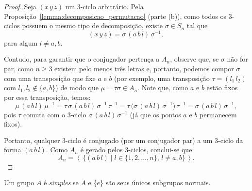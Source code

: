 \documentclass[11pt,openany]{book}
\begin{document}
\begin{proof}
Seja \((x\,y\,z)\) um \(3\)-ciclo arbitrário. Pela Proposição~\ref{lemma:decomposicao_permutacao} (parte (b)), como todos os \(3\)-ciclos possuem o mesmo tipo de decomposição, existe \(\sigma\in S_n\) tal que
\[
(x\,y\,z)=\sigma\,(a\,b\,l)\,\sigma^{-1},
\]
para algum \(l\neq a,b\). 

Contudo, para garantir que o conjugador pertença a \(A_n\), observe que, se \(\sigma\) não for par, como \(n\ge3\) existem pelo menos três letras e, portanto, podemos compor \(\sigma\) com uma transposição que fixe \(a\) e \(b\) (por exemplo, uma transposição \(\tau=(l_1\,l_2)\) com \(l_1,l_2\notin\{a,b\}\)) de modo que \(\mu=\tau\sigma\in A_n\). Note que, como \(a\) e \(b\) estão fixos por essa transposição, temos:
\[
\mu\,(a\,b\,l)\,\mu^{-1} = \tau\,\sigma\,(a\,b\,l)\,\sigma^{-1}\,\tau^{-1} = \tau\,\bigl(\sigma\,(a\,b\,l)\,\sigma^{-1}\bigr)\,\tau^{-1} = \sigma\,(a\,b\,l)\,\sigma^{-1},
\]
pois \(\tau\) comuta com o \(3\)-ciclo \(\sigma\,(a\,b\,l)\,\sigma^{-1}\) (já que os pontos \(a\) e \(b\) permanecem fixos).

Portanto, qualquer \(3\)-ciclo é conjugado (por um conjugador par) a um \(3\)-ciclo da forma \((a\,b\,l)\). Como \(A_n\) é gerado pelos \(3\)-ciclos, conclui-se que
\[
A_n = \left\langle\,\{ (a\,b\,l) \mid l\in\{1,2,\dots,n\},\,l\neq a,b \}\,\right\rangle.
\]
\end{proof}

\begin{definition}
\label{def:grupo_simples}
    Um grupo $A$ é \textit{simples} se $A$ e $\{e\}$ são seus únicos subgrupos normais.
\end{definition}
\end{document}
